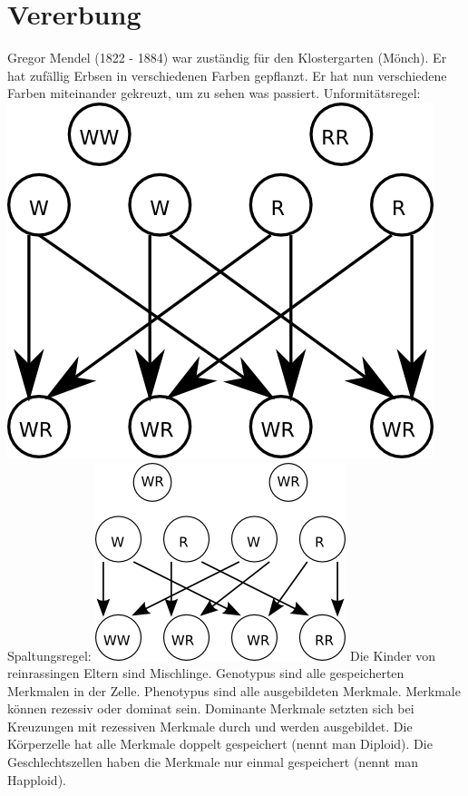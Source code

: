 \documentclass[a4paper]{article}
\begin{document}
\section{Vererbung}

Gregor Mendel (1822 - 1884) war zuständig für den Klostergarten (Mönch). Er hat zufällig Erbsen in verschiedenen Farben gepflanzt. Er hat nun verschiedene Farben miteinander gekreuzt, um zu sehen was passiert.
\newline
\newline
Unformitätsregel:
\newline
\newline
\includegraphics[scale=0.25]{image/1.png}
\newline
\newline
Spaltungsregel:
\newline
\newline
\includegraphics[scale=0.75]{image/2.png}
\newline
\newline
Die Kinder von reinrassingen Eltern sind Mischlinge. Genotypus sind alle gespeicherten Merkmalen in der Zelle. Phenotypus sind alle ausgebildeten Merkmale. Merkmale können rezessiv oder dominat sein. Dominante Merkmale setzten sich bei Kreuzungen mit rezessiven Merkmale durch und werden ausgebildet. Die Körperzelle hat alle Merkmale doppelt gespeichert (nennt man Diploid). Die Geschlechtszellen haben die Merkmale nur einmal gespeichert (nennt man Happloid).
\end{document}
